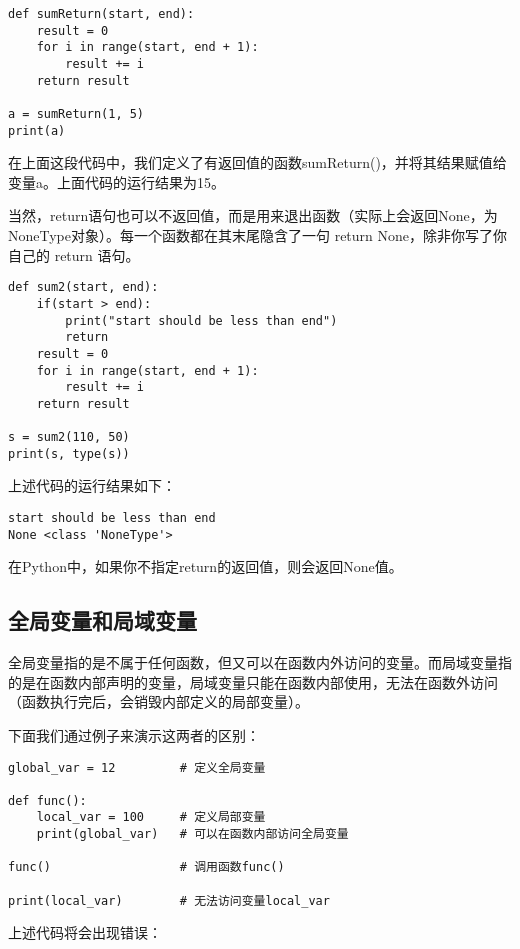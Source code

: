 \begin{lstlisting}
def sumReturn(start, end):
    result = 0
    for i in range(start, end + 1):
        result += i
    return result

a = sumReturn(1, 5)
print(a)
\end{lstlisting}

在上面这段代码中，我们定义了有返回值的函数sumReturn()，并将其结果赋值给变量a。上面代码的运行结果为15。

当然，return语句也可以不返回值，而是用来退出函数（实际上会返回None，为NoneType对象）。每一个函数都在其末尾隐含了一句 return None，除非你写了你自己的 return 语句。

\begin{lstlisting}
def sum2(start, end):
    if(start > end):
        print("start should be less than end")
        return
    result = 0
    for i in range(start, end + 1):
        result += i
    return result

s = sum2(110, 50)
print(s, type(s))
\end{lstlisting}

上述代码的运行结果如下：

\begin{lstlisting}
start should be less than end
None <class 'NoneType'>
\end{lstlisting}

在Python中，如果你不指定return的返回值，则会返回None值。

\subsection{全局变量和局域变量}

全局变量指的是不属于任何函数，但又可以在函数内外访问的变量。而局域变量指的是在函数内部声明的变量，局域变量只能在函数内部使用，无法在函数外访问（函数执行完后，会销毁内部定义的局部变量）。

下面我们通过例子来演示这两者的区别：

\begin{lstlisting}
global_var = 12         # 定义全局变量

def func():
    local_var = 100     # 定义局部变量
    print(global_var)   # 可以在函数内部访问全局变量

func()                  # 调用函数func()

print(local_var)       	# 无法访问变量local_var
\end{lstlisting}

上述代码将会出现错误：

